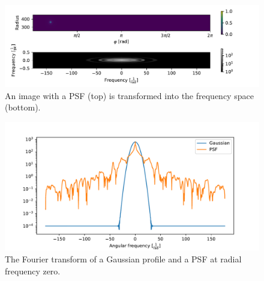 \begin{figure}[H]
	\centering
		\includegraphics[width=1.0\textwidth]{pics/PSF_fourier.pdf}
		\caption{An image with a PSF (top) is transformed into the frequency space (bottom).}
		\label{fig:PSF_fourier}
\end{figure}
\begin{figure}[H]
	\centering
		\includegraphics[width=1.0\textwidth]{pics/PSF_cut_fourier.pdf}
		\caption{The Fourier transform of a Gaussian profile and a PSF at radial frequency zero. }
		\label{fig:PSF_cut_fourier}
\end{figure}
